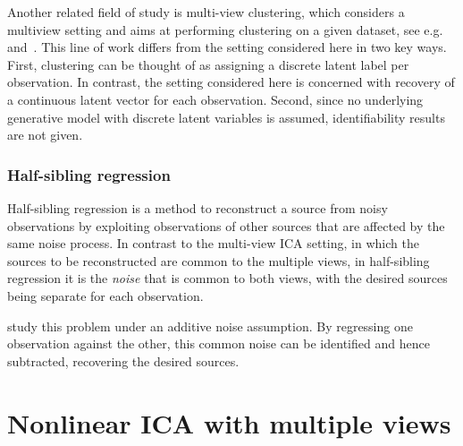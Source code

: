 Another related field of study is multi-view clustering, which considers a multiview setting and aims at performing clustering on a given dataset, see e.g.~\cite{de2005spectral} and~\cite{kumar2011co}. This line of work differs from the setting considered here in two key ways.
First, clustering can be thought of as assigning a discrete latent label per observation. 
In contrast, the setting considered here is concerned with recovery of a continuous latent vector for each observation.
Second, since no underlying generative model with discrete latent variables is assumed, identifiability results are not given.



\subsubsection{Half-sibling regression}
\label{sec:hsr}
Half-sibling regression \citep{scholkopf2016modeling} is a method to reconstruct a source from noisy observations by exploiting observations of other sources that are affected by the same noise process.
In contrast to the multi-view ICA setting, in which the sources to be reconstructed are common to the multiple views, in half-sibling regression it is the \emph{noise} that is common to both views, with the desired sources being separate for each observation.

\cite{scholkopf2016modeling} study this problem under an additive noise assumption. 
By regressing one observation against the other, this common noise can be identified and hence subtracted, recovering the desired sources.

%

\section{Nonlinear ICA with multiple views}\label{sec:ica-nonlinear-ica-with-mulitple-views}

